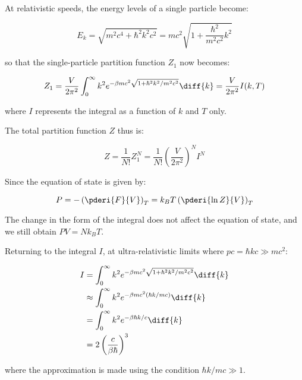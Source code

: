 \documentclass[12pt]{article}
\begin{document}

At relativistic speeds, the energy levels of a single particle become:

\begin{equation}
E_{k} = \sqrt{m^{2} c^{4} + \hbar^{2} k^{2} c^{2}} = m c^{2} \sqrt{1 + \frac{\hbar^{2}}{m^{2} c^{2}} k^{2}}
\end{equation}

so that the single-particle partition function $Z_{1}$ now becomes:

\begin{equation}
Z_{1} = \frac{V}{2\pi^{2}} \int_{0}^{\infty} k^{2} e^{-\beta m c^{2} \sqrt{1 + \hbar^{2}k^{2}/m^{2}c^{2}}} \diff{k} = \frac{V}{2\pi^{2}} I(k, T)
\end{equation}

where $I$ represents the integral as a function of $k$ and $T$ only.

The total partition function $Z$ thus is:

\begin{equation}
Z = \frac{1}{N!} Z_{1}^{N} = \frac{1}{N!} \left( \frac{V}{2\pi^{2}} \right)^{N} I^{N}
\end{equation}

Since the equation of state is given by:

\begin{equation}
P = -\left( \pderi{F}{V} \right)_{T} = k_{B} T \left( \pderi{\ln{Z}}{V} \right)_{T}
\end{equation}

The change in the form of the integral does not affect the equation of state, and we still obtain $PV = Nk_{B}T$.

Returning to the integral $I$, at ultra-relativistic limits where $pc = \hbar k c \gg mc^{2}$:

\begin{equation}
\begin{split}
I &= \int_{0}^{\infty} k^{2} e^{-\beta m c^{2} \sqrt{1 + \hbar^{2}k^{2}/m^{2}c^{2}}} \diff{k} \\
  &\approx \int_{0}^{\infty} k^{2} e^{-\beta m c^{2}  (\hbar k/mc)} \diff{k} \\
  &=\int_{0}^{\infty} k^{2} e^{-\beta \hbar k/c} \diff{k} \\
  &= 2 \left( \frac{c}{\beta \hbar} \right)^3
\end{split}
\end{equation}

where the approximation is made using the condition $\hbar k/mc \gg 1$.
\end{document}
